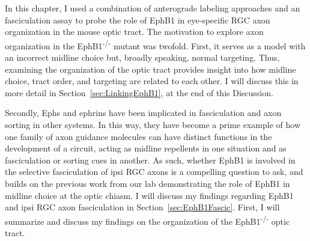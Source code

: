 In this chapter, I used a combination of \invivo{} anterograde labeling approaches and an \invitro{} fasciculation assay to probe the role of EphB1 in eye-specific RGC axon organization in the mouse optic tract.
The motivation to explore axon organization in the EphB1\textsuperscript{-/-} mutant was twofold.
First, it serves as a model with an incorrect midline choice but, broadly speaking, normal targeting.
Thus, examining the organization of the optic tract provides insight into how midline choice, tract order, and targeting are related to each other.
I will discuss this in more detail in Section~\ref{sec:LinkingEphB1}, at the end of this Discussion.

Secondly, Ephs and ephrins have been implicated in fasciculation and axon sorting in other systems.
In this way, they have become a prime example of how one family of axon guidance molecules can have distinct functions in the development of a circuit, acting as midline repellents in one situation and as fasciculation or sorting cues in another.
As such, whether EphB1 is involved in the selective fasciculation of ipsi RGC axons is a compelling question to ask, and builds on the previous work from our lab demonstrating the role of EphB1 in midline choice at the optic chiasm.
I will discuss my findings regarding EphB1 and ipsi RGC axon fasciculation in Section~\ref{sec:EphB1Fascic}.
First, I will summarize and discuss my findings on the organization of the EphB1\textsuperscript{-/-} optic tract.